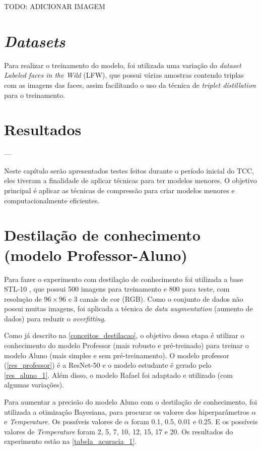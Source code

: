 TODO: ADICIONAR IMAGEM

\section{\textit{Datasets}}\label{sec_datasets}
Para realizar o treinamento do modelo, foi utilizada uma variação do \textit{dataset}
\textit{Labeled faces in the Wild} (LFW), que possui várias amostras contendo triplas com as imagens das faces,
assim facilitando o uso da técnica de \textit{triplet distillation} para o treinamento.

\section{Resultados}\label{sec_resultados}

---

Neste capítulo serão apresentados testes feitos durante o período inicial do TCC, eles tiveram a finalidade de aplicar técnicas para ter modelos menores.
O objetivo principal é aplicar as técnicas de compressão para criar modelos menores e computacionalmente eficientes.

\section{Destilação de conhecimento (modelo Professor-Aluno)}
Para fazer o experimento com destilação de conhecimento foi utilizada a base STL-10 \cite{stl10}, que possui 500 imagens para
treinamento e 800 para teste, com resolução de $96 \times 96$ e 3 canais de cor (RGB). Como o conjunto de dados
não possui muitas imagens, foi aplicada a técnica de \textit{data augmentation} (aumento de dados) para reduzir o
\textit{overfitting}.

Como já descrito na \autoref{conceitos_destilacao}, o objetivo dessa etapa é utilizar o conhecimento do modelo
Professor (mais robusto e pré-treinado) para treinar o modelo Aluno (mais simples e sem pré-treinamento).
O modelo professor (\autoref{res_professor}) é a ResNet-50  \cite{resnet} e o modelo estudante é gerado pelo
\autoref{res_aluno_1}.
Além disso, o modelo Rafael \cite{rafael} foi adaptado e utilizado (com algumas variações).

Para aumentar a precisão do modelo Aluno com o destilação de conhecimento, foi utilizada a otimização
Bayesiana, para procurar os valores dos hiperparâmetros $\alpha$ e \textit{Temperature}.
Os possíveis valores de $\alpha$ foram 0.1, 0.5, 0.01 e 0.25.
E os possíveis valores de \textit{Temperature} foram 2, 5, 7, 10, 12, 15, 17 e 20.
Os resultados do experimento estão na \autoref{tabela_acuracia_1}.

